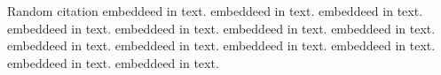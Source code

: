 \documentclass{article}
\begin{document}
Random citation 
\cite{gan2013using} embeddeed in text.
\cite{chapelle2009semi} embeddeed in text.
\cite{bilmes1998gentle} embeddeed in text.
\cite{bishop2006pattern} embeddeed in text.
\cite{tang2008boosting} embeddeed in text.
\cite{reynolds2000speaker} embeddeed in text.
\cite{breiman1996bias} embeddeed in text.
\cite{joshi2002predicting} embeddeed in text.
\cite{ratsch2001soft} embeddeed in text.
\cite{reynolds2015gaussian} embeddeed in text.
\cite{collins1997algorithm} embeddeed in text.
\cite{he2009learning} embeddeed in text.
\cite{alcala2009keel} embeddeed in text.


 

\end{document}
